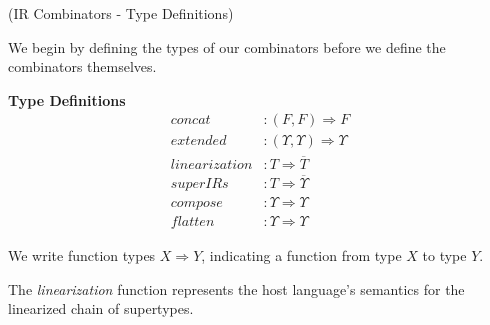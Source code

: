\begin{defn}{(IR Combinators - Type Definitions)}

We begin by defining the types of our combinators before we define the
combinators themselves.

\vspace{0.2cm}
{\bf Type Definitions}
{\small
\begin{align*}
\textit{concat}&        : (F, F) \Rightarrow F\\
\textit{extended}&      : (\Upsilon, \Upsilon) \Rightarrow \Upsilon\\
\textit{linearization}& : T \Rightarrow \overline{T}\\
\textit{superIRs}&      : T \Rightarrow \overline{\Upsilon}\\
\textit{compose}&       : \Upsilon \Rightarrow \Upsilon\\
\textit{flatten}&       : \Upsilon \Rightarrow \Upsilon
\end{align*}
}%

We write function types $X \Rightarrow Y$, indicating a function from type $X$
to type $Y$.

The \textit{linearization} function represents the host language's semantics for the
linearized chain of supertypes.\footnotemark[3]
\end{defn}

